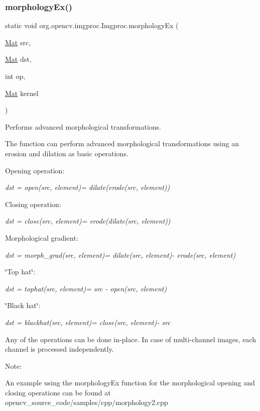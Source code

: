 \subsubsection{\texorpdfstring{morphology\+Ex()}{morphologyEx()}\hspace{0.1cm}{\footnotesize\ttfamily [3/3]}}
{\footnotesize\ttfamily static void org.\+opencv.\+imgproc.\+Imgproc.\+morphology\+Ex (\begin{DoxyParamCaption}\item[{\mbox{\hyperlink{classorg_1_1opencv_1_1core_1_1_mat}{Mat}}}]{src,  }\item[{\mbox{\hyperlink{classorg_1_1opencv_1_1core_1_1_mat}{Mat}}}]{dst,  }\item[{int}]{op,  }\item[{\mbox{\hyperlink{classorg_1_1opencv_1_1core_1_1_mat}{Mat}}}]{kernel }\end{DoxyParamCaption})\hspace{0.3cm}{\ttfamily [static]}}

Performs advanced morphological transformations.

The function can perform advanced morphological transformations using an erosion and dilation as basic operations.

Opening operation\+:

{\itshape dst = open(src, element)= dilate(erode(src, element))}

Closing operation\+:

{\itshape dst = close(src, element)= erode(dilate(src, element))}

Morphological gradient\+:

{\itshape dst = morph\+\_\+grad(src, element)= dilate(src, element)-\/ erode(src, element)}

\char`\"{}\+Top hat\char`\"{}\+:

{\itshape dst = tophat(src, element)= src -\/ open(src, element)}

\char`\"{}\+Black hat\char`\"{}\+:

{\itshape dst = blackhat(src, element)= close(src, element)-\/ src}

Any of the operations can be done in-\/place. In case of multi-\/channel images, each channel is processed independently.

Note\+:


\begin{DoxyItemize}
\item An example using the morphology\+Ex function for the morphological opening and closing operations can be found at opencv\+\_\+source\+\_\+code/samples/cpp/morphology2.\+cpp 
\end{DoxyItemize}


